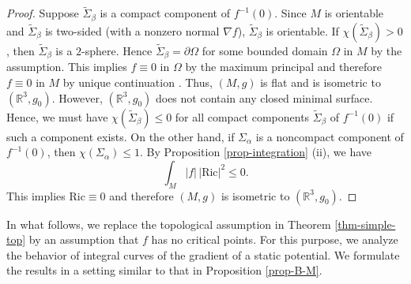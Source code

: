 \documentclass[12pt]{amsart}
\theoremstyle{remark}
\numberwithin{equation}{section}
\newcommand{\Ric}{\mbox{Ric}}
\newcommand{\R}{\mathbb R}
\newcommand{\bee}{\begin{equation*}}
\newcommand{\eee}{\end{equation*}}
\def\p{\partial}
\def\a{\alpha}
\begin{document}
\begin{proof}
Suppose  $ \tilde{\Sigma}_\beta$ is  a compact component of $f^{-1}(0)$.
Since $M$ is orientable and $\tilde \Sigma_\beta $ is two-sided (with a nonzero normal $\nabla f$),
$\tilde{\Sigma}_\beta $ is orientable.
If  $\chi(\tilde{\Sigma}_\beta ) > 0$, then $\tilde{\Sigma}_\beta  $ is a $2$-sphere.
Hence $ \tilde{\Sigma}_\beta = \p \Omega$
for some bounded domain $\Omega$ in $M$ by the assumption.
This implies  $f\equiv0$ in $\Omega$ by the maximum principal  and therefore $f\equiv0$ in $M$ by unique
continuation \cite{Aronszajn-1957}. Thus,
$(M, g)$ is flat and is isometric to $(\R^3, g_0)$.
However, $(\R^3, g_0)$ does not contain any closed minimal surface.
Hence, we must have $\chi ( \tilde{\Sigma}_\beta )  \le 0 $ for all compact components $ \tilde{\Sigma}_\beta $
of $f^{-1}(0)$ if such a component exists.  On the other hand,
if $\Sigma_\a$ is a noncompact component of $f^{-1}(0)$, then  $\chi(\Sigma_\a)\le 1$.
By Proposition \ref{prop-integration} (ii), we have
\bee
  \int_M |f|\,|\Ric|^2\le 0.
  \eee
This implies $\Ric \equiv 0 $ and therefore $(M, g)$ is isometric to $(\R^3, g_0)$.
\end{proof}

In what follows,  we replace the topological assumption  in  Theorem \ref{thm-simple-top}
by an assumption that $f$ has no critical points.
For this purpose,   we analyze the behavior of   integral curves of the gradient of a static potential.
We formulate the results in a setting similar to that in Proposition \ref{prop-B-M}.
\end{document}
